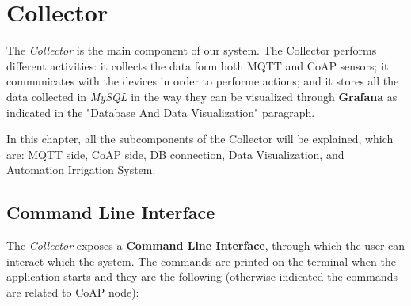 \section{Collector}
The \textit{Collector} is the main component of our system. The Collector performs different activities: it collects the data form both MQTT and CoAP sensors; it communicates with the devices in order to performe actions; and it stores all the data collected in \textit{MySQL} in the way they can be visualized through \textbf{Grafana} as indicated in the "Database And Data Visualization" paragraph.

In this chapter, all the subcomponents of the Collector will be explained, which are:  MQTT side, CoAP side, DB connection, Data Visualization, and Automation Irrigation System.

\subsection{Command Line Interface}
The \textit{Collector} exposes a \textbf{Command Line Interface}, through which the user can interact which the system. The commands are printed on the terminal when the application starts and they are the following (otherwise indicated the commands are related to CoAP node):

